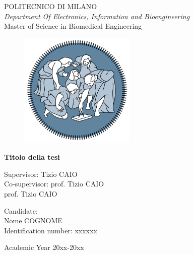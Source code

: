 \thispagestyle{empty}
\vspace*{-1.5cm} {
\begin{center}
  \large
  POLITECNICO DI MILANO\\
  \normalsize
  \textit{Department Of Electronics, Information and Bioengineering}\\
 Master of Science in Biomedical Engineering\\
  \vspace*{1cm}
  \begin{figure}[htbp]
    \begin{center}
      \includegraphics[width=5.5cm]{./img/logo_polimi}
    \end{center}
  \end{figure}
  \vspace*{0.3cm} \LARGE



  \textbf{Titolo della tesi}\\



  \vspace*{.50truecm}
\end{center}
\vspace*{2.0cm}	\small
\begin{flushleft}


  Supervisor: \hspace{.5cm} Tizio \uppercase{Caio} \\
  Co-supervisor: prof.  Tizio \uppercase{Caio} \\
\hspace{2.45cm} prof. Tizio \uppercase{Caio}

\end{flushleft}
\vspace*{0.7cm}
\begin{flushright}


Candidate:\\ Nome \uppercase{Cognome} \\ Identification number: xxxxxx \\


\end{flushright}
\vspace*{0.5cm}
\begin{center}



  Academic Year 20xx-20xx
\end{center} \clearpage
}

\normalfont
